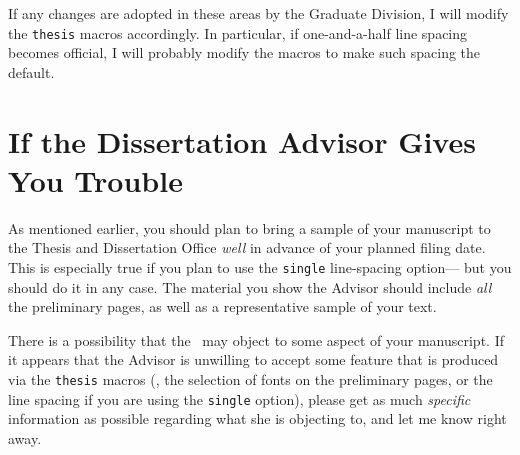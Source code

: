 If any changes are adopted in these areas by the Graduate Division,
I will modify the \verb+thesis+ macros accordingly.
In particular, if one-and-a-half line spacing becomes official,
I will probably modify the macros to make such spacing the default.

\section {If the Dissertation Advisor Gives You Trouble}

As mentioned earlier, you should plan to bring a sample of your
manuscript to the Thesis and Dissertation Office {\em well\/} in
advance of your planned filing date.
This is especially true if you plan to use the \verb+single+
line-spacing option---%
but you should do it in any case.
The material you show the Advisor
should include {\em all\/} the preliminary pages,
as well as a representative sample of your text.

There is a possibility that the \tdadvisor\ may object to some
aspect of your manuscript.
If it appears that the Advisor is unwilling to accept some feature
that is produced via the \verb+thesis+ macros
(\eg, the selection of fonts on the preliminary pages,
or the line spacing if you are using the \verb+single+ option),
please get as much {\em specific\/} information as possible
regarding what she is objecting to,
and let me know right away.


